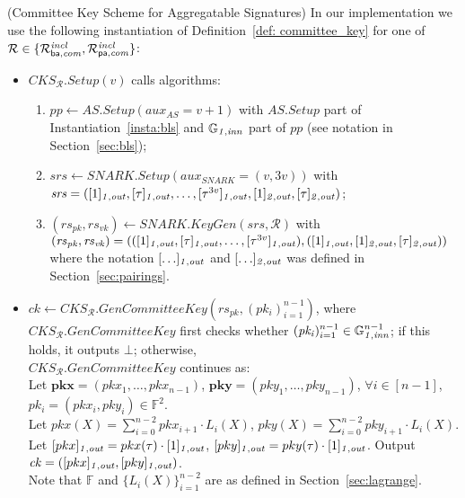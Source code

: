 \begin{construction}(Committee Key Scheme for Aggregatable Signatures)
\label{inst:cks} In our implementation we use the following instantiation of Definition~\ref{def: committee_key} for one of $\mathcal{R} \in \{\mathcal{R}^{\mathit{incl}}_{\mathsf{ba},\mathit{com}}, \mathcal{R}^{\mathit{incl}}_{\mathsf{pa},\mathit{com}}\}$:
\begin{itemize}
\item $\mathit{CKS_{\mathcal{R}}.Setup}(v)$ calls algorithms: 
\begin{enumerate}
\item $\mathit{pp} \leftarrow \mathit{AS.Setup}(\mathit{aux_{\mathit{AS}}}= v+1)$ with  $\mathit{AS.Setup}$ part of Instantiation~\ref{insta:bls} and 
$\mathbb{G}_{\mathit{1,inn}}$ part of $\mathit{pp}$ (see notation in Section~\ref{sec:bls});
\item $\mathit{srs} \leftarrow \mathit{SNARK.Setup}(\mathit{aux_{\mathit{SNARK}}} = (v, 3v))$ with \\
$\mathit{srs}=([1]_{\mathit{1,out}}, [\tau]_{\mathit{1,out}}, \ldots, [\tau^{3v}]_{\mathit{1,out}}, [1]_{\mathit{2,out}}, [\tau]_{\mathit{2,out}})$;
\item $(\mathit{rs}_{\mathit{pk}}, \mathit{rs}_{\mathit{vk}}) \leftarrow \mathit{SNARK.KeyGen}(\mathit{srs}, \mathcal{R})$ with \\ 
$(\mathit{rs}_{\mathit{pk}}, \mathit{rs}_{\mathit{vk}}) =  (([1]_{\mathit{1,out}}, [\tau]_{\mathit{1,out}}, \ldots, [\tau^{3v}]_{\mathit{1,out}}), \\ 
([1]_{\mathit{1,out}}, [1]_{\mathit{2,out}}, [\tau]_{\mathit{2,out}}))$ where %
the notation $[\ldots]_{\mathit{1,out}}$ and $[\ldots]_{\mathit{2,out}}$ was defined in Section~\ref{sec:pairings}.
\end{enumerate}

\item $\mathit{ck} \leftarrow \mathit{CKS_{\mathcal{R}}.GenCommitteeKey}(\mathit{rs_{pk}}, (\mathit{pk_i})_{i=1}^{n-1})$, where 
$\mathit{CKS_{\mathcal{R}}.GenCommitteeKey}$ first checks whether $(\mathit{pk_i})_{i=1}^{n-1} \in \mathbb{G}_{\mathit{1,inn}}^{n-1}$; 
if this holds, it outputs $\bot$; otherwise, \\$\mathit{CKS_{\mathcal{R}}.GenCommitteeKey}$ continues as: \\
\noindent Let $\mathbf{pkx} = (\mathit{pkx_{1}}, \ldots, \mathit{pkx_{n-1}})$, $\mathbf{pky} = (\mathit{pky_{1}}, \ldots, \mathit{pky_{n-1}})$, $\forall i \in [n-1]$, $\mathit{pk_i} = (\mathit{pkx_i}, \mathit{pky_i}) \in \mathbb{F}^{2}$. \\
\noindent Let $pkx(X) = \sum_{i=0}^{n-2} \mathit{pkx_{i+1}} \cdot L_i(X)$, $pky(X) = \sum_{i=0}^{n-2} \mathit{pky_{i+1}} \cdot L_i(X)$. Let $[pkx]_{\mathit{1,out}} = pkx(\tau) \cdot [1]_{\mathit{1,out}}$, $[pky]_{\mathit{1,out}} = pky(\tau) \cdot [1]_{\mathit{1,out}}$. Output $\mathit{ck} = ([pkx]_{\mathit{1,out}}, [pky]_{\mathit{1,out}})$.\\
\noindent Note that $\mathbb{F}$ and $\{L_i(X)\}_{i=1}^{n-2}$ are as defined in Section~\ref{sec:lagrange}. 


\end{itemize}
\end{construction}
